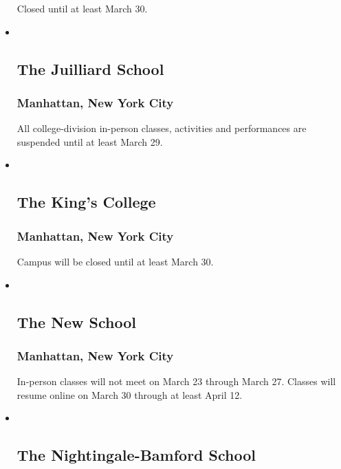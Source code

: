 \begin{itemize}
  Closed until at least March 30.
\item ~
  \hypertarget{the-juilliard-school}{%
  \subsection{The Juilliard School}\label{the-juilliard-school}}

  \hypertarget{manhattan-new-york-city-13}{%
  \subsubsection{Manhattan, New York
  City}\label{manhattan-new-york-city-13}}

  All college-division in-person classes, activities and performances
  are suspended until at least March 29.
\item ~
  \hypertarget{the-kings-college}{%
  \subsection{The King's College}\label{the-kings-college}}

  \hypertarget{manhattan-new-york-city-14}{%
  \subsubsection{Manhattan, New York
  City}\label{manhattan-new-york-city-14}}

  Campus will be closed until at least March 30.
\item ~
  \hypertarget{the-new-school}{%
  \subsection{The New School}\label{the-new-school}}

  \hypertarget{manhattan-new-york-city-15}{%
  \subsubsection{Manhattan, New York
  City}\label{manhattan-new-york-city-15}}

  In-person classes will not meet on March 23 through March 27. Classes
  will resume online on March 30 through at least April 12.
\item ~
  \hypertarget{the-nightingale-bamford-school}{%
  \subsection{The Nightingale-Bamford
  School}\label{the-nightingale-bamford-school}}


\end{itemize}
